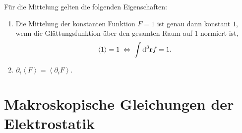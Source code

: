 Für die Mittelung gelten die folgenden Eigenschaften:\begin{enumerate}
	\item Die Mittelung der konstanten Funktion $F=1$ ist genau dann konstant $1$, wenn die Glättungsfunktion über den gesamten Raum auf $1$ normiert ist,
		\begin{equation*}
			\left\langle 1\right\rangle =1\;\Leftrightarrow\; \int \text{d} ^{3}\mathbf{r}f=1.
		\end{equation*}
	\item $\partial _{i}\left\langle F\right\rangle =\left\langle \partial _{i}F\right\rangle $.
\end{enumerate}

\section{Makroskopische Gleichungen der Elektrostatik\label{sec:Makroskopische_Gleichungen_der_Elektrostatik}}

